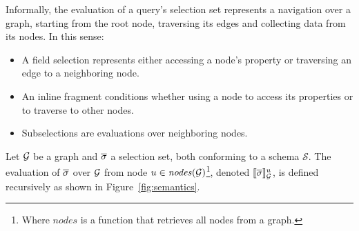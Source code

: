 



Informally, the evaluation of a query's selection set represents a navigation over a graph, starting from the root node, traversing its edges and collecting data from its nodes. In this sense:
\begin{itemize}
    \item A field selection represents either accessing a node's property or traversing an edge to a neighboring node.
    \item An inline fragment conditions whether using a node to access its properties or to traverse to other nodes.
    \item Subselections are evaluations over neighboring nodes.
\end{itemize}

\begin{definition}
Let $\mathcal{G}$ be a graph and $\overline{\sigma}$ a selection set, both conforming to a schema $\mathcal{S}$. The evaluation of $\overline{\sigma}$ over $\mathcal{G}$ from node $u \in \mathit{nodes}(\mathcal{G})$\footnote{Where $\mathit{nodes}$ is a function that retrieves all nodes from a graph.}, denoted $\llbracket \overline{\sigma} \rrbracket^{u}_{\mathcal{G}}$, is defined recursively as shown in Figure~\ref{fig:semantics}. 
\end{definition}

